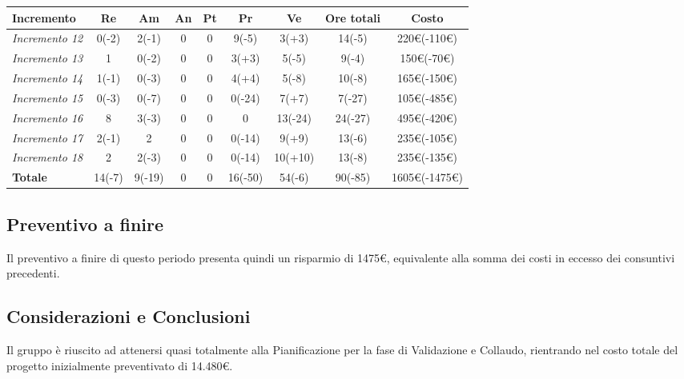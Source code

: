 {{{{{{{{{{{{{{{{{{{{	\begin{center}
		\renewcommand{\arraystretch}{1.4}
		\begin{tabularx}{\textwidth}{|X|c|c|c|c|c|c|c|c|}
			\hline
			\rowcolor{airforceblue}
			\textbf{Incremento} & \textbf{Re} & \textbf{Am} & \textbf{An} & \textbf{Pt} & \textbf{Pr} & \textbf{Ve} & \textbf{Ore totali} & \textbf{Costo} \\
			\hline
			\textit{Incremento 12} & 0(-2) & 2(-1) & 0 & 0 & 9(-5) & 3(+3) & 14(-5) & 220\euro(-110\euro) \\
			\hline
			\textit{Incremento 13} & 1 & 0(-2) & 0 & 0 & 3(+3) & 5(-5) & 9(-4) & 150\euro(-70\euro) \\
			\hline
			\textit{Incremento 14} & 1(-1) & 0(-3) & 0 & 0 & 4(+4) & 5(-8) & 10(-8) & 165\euro(-150\euro) \\
			\textit{Incremento 15} & 0(-3) & 0(-7) & 0 & 0 & 0(-24) & 7(+7) & 7(-27) & 105\euro(-485\euro) \\
			\textit{Incremento 16} & 8 & 3(-3) & 0 & 0 & 0 & 13(-24) & 24(-27) & 495\euro(-420\euro) \\
			\textit{Incremento 17} & 2(-1) & 2 & 0 & 0 & 0(-14) & 9(+9) & 13(-6) & 235\euro(-105\euro) \\
			\hline
			\textit{Incremento 18} & 2 & 2(-3) & 0 & 0 & 0(-14) & 10(+10) & 13(-8) & 235\euro(-135\euro) \\
			\hline
			\textbf{Totale} & 14(-7) & 9(-19) & 0 & 0 & 16(-50) & 54(-6) & 90(-85) & 1605\euro(-1475\euro) \\
			\hline
		\end{tabularx}
	\end{center}

\subsection{Preventivo a finire}\label{ConsuntivoValidazioneCollaudoPreventivoFinire}
Il preventivo a finire di questo periodo presenta quindi un risparmio di 1475\euro, equivalente alla somma dei costi in eccesso dei consuntivi precedenti.


\subsection{Considerazioni e Conclusioni}

Il gruppo è riuscito ad attenersi quasi totalmente alla Pianificazione per la fase di Validazione e Collaudo, rientrando nel costo totale del progetto inizialmente preventivato di 14.480\euro.


}}}}}}}}}}}}}}}}}}}}
